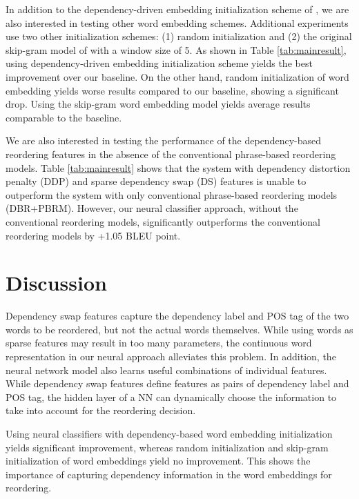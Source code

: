 \documentclass[letterpaper]{article}
\begin{document}
In addition to the dependency-driven embedding initialization scheme of \cite{bansal_tailoring_2014}, we are also interested in testing other word embedding schemes. Additional experiments use two other initialization schemes: (1) random initialization and (2) the original skip-gram model of \cite{mikolov_efficient_2013} with a window size of 5. As shown in Table \ref{tab:mainresult}, using dependency-driven embedding initialization scheme yields the best improvement over our baseline. On the other hand, random initialization of word embedding yields worse results compared to our baseline, showing a significant drop. Using the skip-gram word embedding model yields average results comparable to the baseline.

We are also interested in testing the performance of the dependency-based reordering features in the absence of the conventional phrase-based reordering models. Table \ref{tab:mainresult} shows that the system with dependency distortion penalty (DDP) and sparse dependency swap (DS) features is unable to outperform the system with only conventional phrase-based reordering models (DBR+PBRM). However, our neural classifier approach, without the conventional reordering models, significantly outperforms the conventional reordering models by +1.05 BLEU point.

\section{Discussion}

Dependency swap features capture the dependency label and POS tag of the two words to be reordered, but not the actual words themselves. While using words as sparse features may result in too many parameters, the continuous word representation in our neural approach alleviates this problem. In addition, the neural network model also learns useful combinations of individual features. While dependency swap features \cite{hadiwinoto_swap_2016} define features as pairs of dependency label and POS tag, the hidden layer of a NN can dynamically choose the information to take into account for the reordering decision.

Using neural classifiers with dependency-based word embedding initialization yields significant improvement, whereas random initialization and skip-gram initialization of word embeddings yield no improvement. This shows the importance of capturing dependency information in the word embeddings for reordering.
\end{document}
